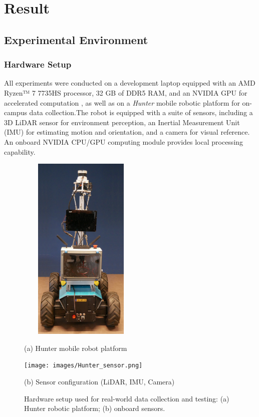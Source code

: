\chapter{Result }
\label{ch:intro}

\section{Experimental Environment}

\subsection{Hardware Setup}
All experiments were conducted on a development laptop equipped with an AMD Ryzen™ 7 7735HS processor, 32 GB of DDR5 RAM, and an NVIDIA GPU for accelerated computation , as well as on a \emph{Hunter} mobile robotic platform for on-campus data collection.The robot is equipped with a suite of sensors, including a 3D LiDAR sensor for environment perception, an Inertial Measurement Unit (IMU) for estimating motion and orientation, and a camera for visual reference. An onboard NVIDIA CPU/GPU computing module provides local processing capability.

\begin{figure}[H]
	\centering
	\begin{minipage}{0.5\textwidth}
		\centering
		\includegraphics[height=9cm , width=6cm]{images/Hunter_body.png}
		\caption*{(a) Hunter mobile robot platform}
	\end{minipage}\hfill
	\begin{minipage}{0.5\textwidth}
		\centering
		\texttt{[image: images/Hunter\_sensor.png]}
		\caption*{(b) Sensor configuration (LiDAR, IMU, Camera)}
	\end{minipage}
	\caption{Hardware setup used for real-world data collection and testing: (a) Hunter robotic platform; (b) onboard sensors.}
	\label{fig:hunter-robot-setup}
\end{figure}


